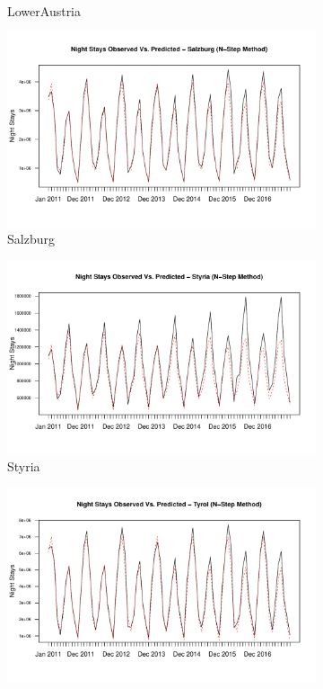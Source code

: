 \documentclass[a4paper,reqno,]{article}
\begin{document}
\begin{figure}[H]
\begin{subfigure}[b]{0.32\linewidth}
    \caption{LowerAustria}
  \end{subfigure}
  \begin{subfigure}[b]{0.32\linewidth}
    \includegraphics[width=\linewidth]{images/SVR/SalzburgNstepSVR.pdf}
    \caption{Salzburg}
  \end{subfigure}
  \begin{subfigure}[b]{0.32\linewidth}
    \includegraphics[width=\linewidth]{images/SVR/StyriaNstepSVR.pdf}
    \caption{Styria}
  \end{subfigure}
  \begin{subfigure}[b]{0.32\linewidth}
    \includegraphics[width=\linewidth]{images/SVR/TyrolNstepSVR.pdf}

\end{subfigure}
\end{figure}
\end{document}
